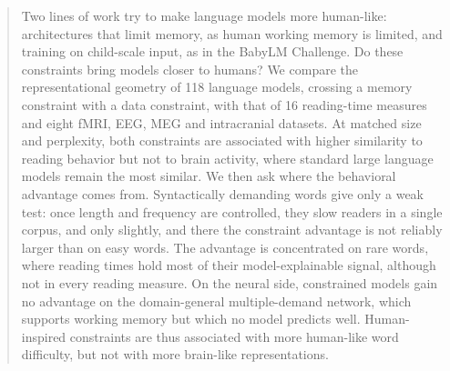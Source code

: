 \begin{abstract}
Two lines of work try to make language models more human-like: architectures that limit memory, as human working memory is limited, and training on child-scale input, as in the BabyLM Challenge. Do these constraints bring models closer to humans? We compare the representational geometry of 118 language models, crossing a memory constraint with a data constraint, with that of 16 reading-time measures and eight fMRI, EEG, MEG and intracranial datasets. At matched size and perplexity, both constraints are associated with higher similarity to reading behavior but not to brain activity, where standard large language models remain the most similar. We then ask where the behavioral advantage comes from. Syntactically demanding words give only a weak test: once length and frequency are controlled, they slow readers in a single corpus, and only slightly, and there the constraint advantage is not reliably larger than on easy words. The advantage is concentrated on rare words, where reading times hold most of their model-explainable signal, although not in every reading measure. On the neural side, constrained models gain no advantage on the domain-general multiple-demand network, which supports working memory but which no model predicts well. Human-inspired constraints are thus associated with more human-like word difficulty, but not with more brain-like representations.
\end{abstract}
